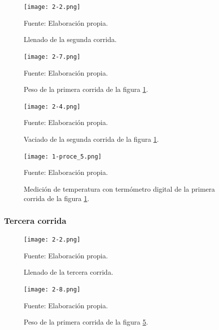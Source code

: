 \documentclass[12pt,letterpaper]{exam}
\begin{document}
\begin{multicols}{2}
\begin{figure}[H]
\centering
\texttt{[image: 2-2.png]}
\caption{Llenado de la segunda corrida.}
\begin{center}
Fuente: Elaboración propia.
\end{center}
\label{fig:2-balón_2}
\end{figure}

\begin{figure}[H]
\centering
\texttt{[image: 2-7.png]}
\caption{Peso de la primera corrida de la figura \ref{fig:2-balón_2}.}
\begin{center}
Fuente: Elaboración propia.
\end{center}
\label{fig:2-Peso_2}
\end{figure}


\begin{figure}[H]
\centering
\texttt{[image: 2-4.png]}
\caption{Vaciado de la segunda corrida de la figura \ref{fig:2-balón_2}.}
\begin{center}
Fuente: Elaboración propia.
\end{center}
\label{fig:2-vaciado_2}
\end{figure}


\begin{figure}[H]
\centering
\texttt{[image: 1-proce\_5.png]}
\caption{Medición de temperatura con termómetro digital de la primera corrida de la figura \ref{fig:2-balón_2}.}
\begin{center}
Fuente: Elaboración propia.
\end{center}
\label{fig:2-Termómetro_2}
\end{figure}


\subsubsection{Tercera corrida}

\begin{figure}[H]
\centering
\texttt{[image: 2-2.png]}
\caption{Llenado de la tercera corrida.}
\begin{center}
Fuente: Elaboración propia.
\end{center}
\label{fig:2-balón_3}
\end{figure}


\begin{figure}[H]
\centering
\texttt{[image: 2-8.png]}
\caption{Peso de la primera corrida de la figura \ref{fig:2-balón_3}.}
\begin{center}
Fuente: Elaboración propia.
\end{center}
\label{fig:2-Peso_3}
\end{figure}



\end{multicols}
\end{document}
